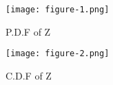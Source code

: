 \documentclass[journal,12pt,twocolumn]{IEEEtran}
\begin{document}
\begin{figure}[h]
    \begin{center}
    \texttt{[image: figure-1.png]}
    \end{center}
    \caption{P.D.F of Z}\label{Fig 1:}
\end{figure}
\begin{figure}[h]
   \begin{center}
    \texttt{[image: figure-2.png]}
    \end{center}
   \caption{C.D.F of Z}\label{Fig2:}
\end{figure}
\end{document}
